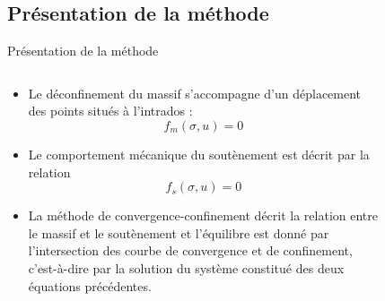 \documentclass{beamer}
\begin{document}
\subsection{Présentation de la méthode}
\begin{frame}{Présentation de la méthode}
\begin{columns}

\begin{column}{0.54\textwidth}
  \begin{itemize}
      \item Le déconfinement du massif s'accompagne d'un déplacement des points situés à l'intrados : 
      $$f_m (\sigma , u) = 0$$
      
      \item Le comportement mécanique du soutènement est décrit par la relation 
      $$f_s (\sigma , u) = 0$$
      
      \item La méthode de convergence-confinement décrit la relation entre le massif et le soutènement et l'équilibre est donné par l'intersection des courbe de convergence et de confinement, c'est-à-dire par la solution du système constitué des deux équations précédentes. 
  \end{itemize}  
\end{column}


\begin{column}{0.45\textwidth}
\begin{figure}
\centering
\includegraphics[width=5cm]{principe.png}
\end{figure}
\end{column}
\end{columns}

\end{frame}
\end{document}
